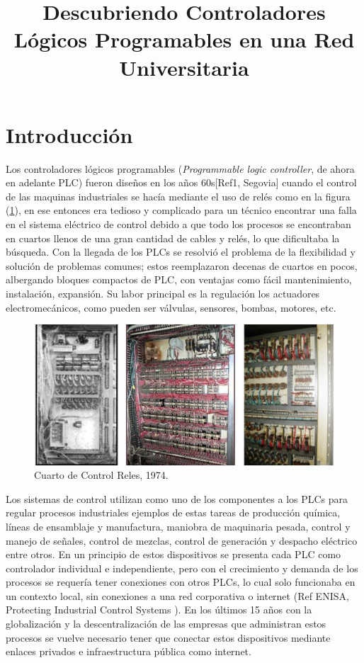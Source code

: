 \documentclass[jou]{apa6}   %
\title{Descubriendo Controladores Lógicos Programables en una Red Universitaria}
\begin{document}
\maketitle    
                     
\section{Introducción}
Los controladores lógicos programables (\textit{Programmable logic controller}, de ahora en adelante PLC) fueron diseños en los años 60s[Ref1, Segovia] cuando el control de las maquinas industriales se hacía mediante el uso de relés como en la figura (\ref{fig:horizonte}), en ese entonces era tedioso y complicado para un técnico encontrar una falla en el sistema eléctrico de control debido a que todo los procesos se encontraban en cuartos llenos de  una gran cantidad de cables y relés, lo que dificultaba la búsqueda. Con la llegada de los  PLCs se resolvió el problema de la flexibilidad y solución de problemas comunes; estos reemplazaron decenas de cuartos en pocos, albergando bloques compactos de PLC, con ventajas como fácil mantenimiento, instalación, expansión. Su labor principal es la regulación  los actuadores electromecánicos, como pueden ser válvulas, sensores, bombas, motores, etc.\\

\begin{figure}[htb]
\centering
\includegraphics[scale=0.2]{images/relayroom.png}
\caption{Cuarto de Control Reles, 1974.} \label{fig:horizonte}
\end{figure}

Los sistemas de control utilizan como uno de los componentes a los PLCs  para regular procesos industriales  ejemplos de estas tareas de producción química, líneas de ensamblaje y manufactura, maniobra de maquinaria pesada,  control y manejo de señales, control de mezclas, control de generación y despacho eléctrico entre otros. En un principio de estos dispositivos se presenta cada PLC como controlador individual e independiente, pero con el crecimiento y demanda de los procesos se requería  tener conexiones con otros PLCs, lo cual solo funcionaba en un contexto local, sin conexiones a una red corporativa o internet  (Ref ENISA, Protecting Industrial Control Systems ). En los últimos 15 años con la globalización y la descentralización  de las empresas que administran estos procesos se vuelve necesario tener que conectar estos dispositivos mediante enlaces privados e infraestructura pública como internet.\\
\end{document}
